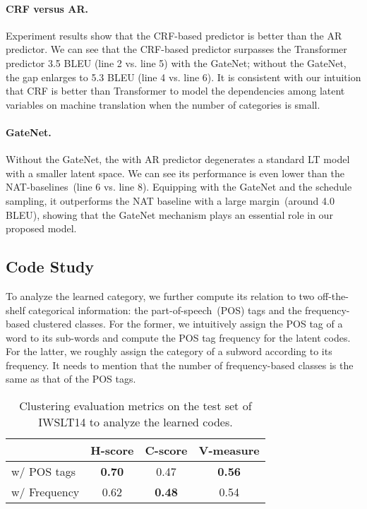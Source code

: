 \paragraph{CRF versus AR.} 
Experiment results show that the CRF-based predictor is better than the AR predictor. 
We can see that the CRF-based predictor surpasses the Transformer predictor 3.5 BLEU (line 2 vs. line 5) with the GateNet;
without the GateNet, the gap enlarges to 5.3 BLEU (line 4 vs. line 6). 
It is consistent with our intuition that CRF is better than Transformer to model the dependencies among latent variables on machine translation when the number of categories is small. 

\paragraph{GateNet.} 
Without the GateNet, the \method with AR predictor degenerates a standard LT model with a smaller latent space. 
We can see its performance is even lower than the NAT-baselines~(line 6 vs. line 8). 
Equipping with the GateNet and the schedule sampling, it outperforms the NAT baseline with a large margin~(around 4.0 BLEU), showing that the GateNet mechanism plays an essential role in our proposed model.

\subsection{Code Study}
To analyze the learned category, we further compute its relation to two off-the-shelf categorical information: the part-of-speech~(POS) tags and the frequency-based clustered classes.
For the former, we intuitively assign the POS tag of a word to its sub-words and compute the POS tag frequency for the latent codes. 
For the latter, we roughly assign the category of a subword according to its frequency.
It needs to mention that the number of frequency-based classes is the same as that of the POS tags.

\begin{table}[tbp]
\small
\tabcolsep 3pt
\centering
\begin{tabular}{lccc} 
\toprule
               & \textbf{H-score}   & \textbf{C-score}  & \textbf{V-measure}    \\
\midrule
w/ POS tags    & \textbf{0.70}      & 0.47              & \textbf{0.56}         \\
w/ Frequency   & 0.62               &\textbf{0.48}      & 0.54                  \\
\bottomrule
\end{tabular}
\caption{Clustering evaluation metrics on the test set of IWSLT14 to analyze the learned codes. }
\label{tab:cluster}
\end{table}
